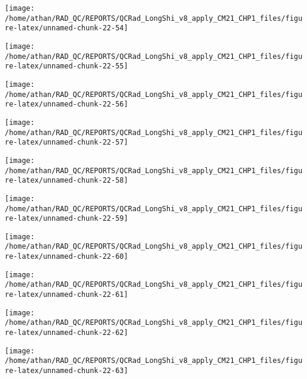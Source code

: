 \documentclass[
  10pt,
  a4paper,oneside]{article}
\begin{document}
\begin{center}\texttt{[image: /home/athan/RAD\_QC/REPORTS/QCRad\_LongShi\_v8\_apply\_CM21\_CHP1\_files/figure-latex/unnamed-chunk-22-54]} \end{center}

\begin{center}\texttt{[image: /home/athan/RAD\_QC/REPORTS/QCRad\_LongShi\_v8\_apply\_CM21\_CHP1\_files/figure-latex/unnamed-chunk-22-55]} \end{center}

\begin{center}\texttt{[image: /home/athan/RAD\_QC/REPORTS/QCRad\_LongShi\_v8\_apply\_CM21\_CHP1\_files/figure-latex/unnamed-chunk-22-56]} \end{center}

\begin{center}\texttt{[image: /home/athan/RAD\_QC/REPORTS/QCRad\_LongShi\_v8\_apply\_CM21\_CHP1\_files/figure-latex/unnamed-chunk-22-57]} \end{center}

\begin{center}\texttt{[image: /home/athan/RAD\_QC/REPORTS/QCRad\_LongShi\_v8\_apply\_CM21\_CHP1\_files/figure-latex/unnamed-chunk-22-58]} \end{center}

\begin{center}\texttt{[image: /home/athan/RAD\_QC/REPORTS/QCRad\_LongShi\_v8\_apply\_CM21\_CHP1\_files/figure-latex/unnamed-chunk-22-59]} \end{center}

\begin{center}\texttt{[image: /home/athan/RAD\_QC/REPORTS/QCRad\_LongShi\_v8\_apply\_CM21\_CHP1\_files/figure-latex/unnamed-chunk-22-60]} \end{center}

\begin{center}\texttt{[image: /home/athan/RAD\_QC/REPORTS/QCRad\_LongShi\_v8\_apply\_CM21\_CHP1\_files/figure-latex/unnamed-chunk-22-61]} \end{center}

\begin{center}\texttt{[image: /home/athan/RAD\_QC/REPORTS/QCRad\_LongShi\_v8\_apply\_CM21\_CHP1\_files/figure-latex/unnamed-chunk-22-62]} \end{center}

\begin{center}\texttt{[image: /home/athan/RAD\_QC/REPORTS/QCRad\_LongShi\_v8\_apply\_CM21\_CHP1\_files/figure-latex/unnamed-chunk-22-63]} \end{center}
\end{document}
